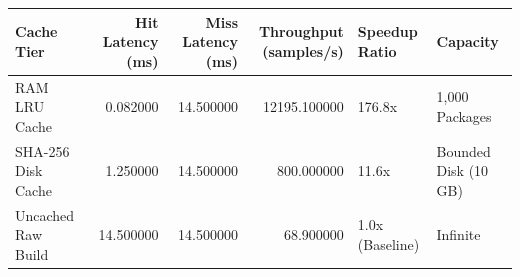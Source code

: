 \begin{tabular}{lrrrll}
\toprule
Cache Tier & Hit Latency (ms) & Miss Latency (ms) & Throughput (samples/s) & Speedup Ratio & Capacity \\
\midrule
RAM LRU Cache & 0.082000 & 14.500000 & 12195.100000 & 176.8x & 1,000 Packages \\
SHA-256 Disk Cache & 1.250000 & 14.500000 & 800.000000 & 11.6x & Bounded Disk (10 GB) \\
Uncached Raw Build & 14.500000 & 14.500000 & 68.900000 & 1.0x (Baseline) & Infinite \\
\bottomrule
\end{tabular}
